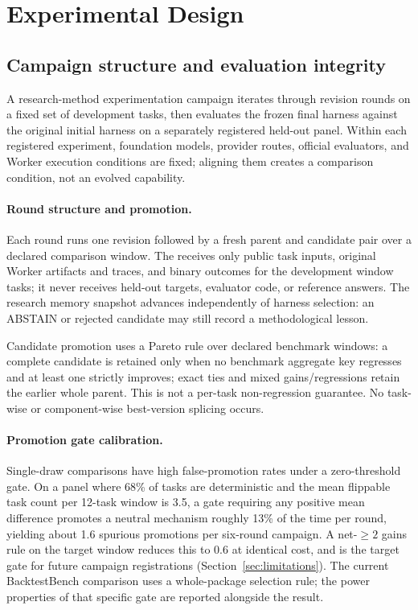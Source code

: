 \section{Experimental Design}
\label{sec:experiments}

\subsection{Campaign structure and evaluation integrity}

A research-method experimentation campaign iterates through \Evolver{}
revision rounds on a fixed set of development tasks, then evaluates the
frozen final harness against the original initial harness on a separately
registered held-out panel.  Within each registered experiment, foundation
models, provider routes, official evaluators, and Worker execution conditions
are fixed; aligning them creates a comparison condition, not an evolved
capability.

\paragraph{Round structure and promotion.}
Each round runs one \Evolver{} revision followed by a fresh parent and
candidate \Worker{} pair over a declared comparison window.  The \Evolver{}
receives only public task inputs, original Worker artifacts and traces, and
binary outcomes for the development window tasks; it never receives held-out
targets, evaluator code, or reference answers.  The research memory snapshot
advances independently of harness selection: an ABSTAIN or rejected candidate
may still record a methodological lesson.

Candidate promotion uses a Pareto rule over declared benchmark windows: a
complete candidate is retained only when no benchmark aggregate key regresses
and at least one strictly improves; exact ties and mixed gains/regressions
retain the earlier whole parent.  This is not a per-task non-regression
guarantee.  No task-wise or component-wise best-version splicing occurs.

\paragraph{Promotion gate calibration.}
Single-draw comparisons have high false-promotion rates under a zero-threshold
gate.  On a panel where 68\% of tasks are deterministic and the mean flippable
task count per 12-task window is 3.5, a gate requiring any positive mean
difference promotes a neutral mechanism roughly 13\% of the time per round,
yielding about 1.6 spurious promotions per six-round campaign.  A net-\(\geq
2\) gains rule on the target window reduces this to 0.6 at identical cost, and
is the target gate for future campaign registrations (Section~\ref{sec:limitations}).
The current BacktestBench comparison uses a whole-package selection rule;
the power properties of that specific gate are reported alongside the result.

